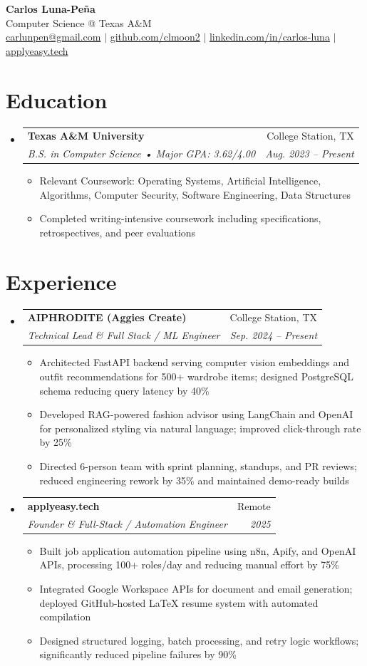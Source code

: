 \documentclass[letterpaper,11pt]{article}
\makeatletter
\newcommand{\resumeItem}[1]{
  \item\small{{#1 \vspace{-2pt}}}
}
\newcommand{\resumeSubheading}[4]{
  \vspace{-2pt}\item
    \begin{tabular*}{0.97\textwidth}[t]{l@{\extracolsep{\fill}}r}
      \textbf{#1} & #2 \\
      \textit{\small#3} & \textit{\small #4} \\
    \end{tabular*}\vspace{-7pt}
}
\newcommand{\resumeSubHeadingListStart}{\begin{itemize}[leftmargin=0.15in, label={}]}
\newcommand{\resumeSubHeadingListEnd}{\end{itemize}}
\newcommand{\resumeItemListStart}{\begin{itemize}}
\newcommand{\resumeItemListEnd}{\end{itemize}\vspace{-5pt}}
\makeatother
\begin{document}
\begin{center}
  \textbf{\Huge Carlos Luna-Pe\~na} \\
  \small Computer Science @ Texas A\&M \\
  \href{mailto:carlunpen@gmail.com}{carlunpen@gmail.com} $|$ \href{https://github.com/clmoon2}{github.com/clmoon2} $|$ \href{https://linkedin.com/in/carlos-luna}{linkedin.com/in/carlos-luna} $|$ \href{https://applyeasy.tech}{applyeasy.tech}
\end{center}

\section{Education}
\resumeSubHeadingListStart
\resumeSubheading
  {Texas A\&M University}{College Station, TX}
  {B.S. in Computer Science • Major GPA: 3.62/4.00}{Aug. 2023 -- Present}
  \resumeItemListStart
    \resumeItem{Relevant Coursework: Operating Systems, Artificial Intelligence, Algorithms, Computer Security, Software Engineering, Data Structures}
    \resumeItem{Completed writing-intensive coursework including specifications, retrospectives, and peer evaluations}
  \resumeItemListEnd
\resumeSubHeadingListEnd

\section{Experience}
\resumeSubHeadingListStart
\resumeSubheading
  {AIPHRODITE (Aggies Create)}{College Station, TX}
  {Technical Lead \& Full Stack / ML Engineer}{Sep. 2024 -- Present}
  \resumeItemListStart
    \resumeItem{Architected FastAPI backend serving computer vision embeddings and outfit recommendations for 500+ wardrobe items; designed PostgreSQL schema reducing query latency by 40\%}
    \resumeItem{Developed RAG-powered fashion advisor using LangChain and OpenAI for personalized styling via natural language; improved click-through rate by 25\%}
    \resumeItem{Directed 6-person team with sprint planning, standups, and PR reviews; reduced engineering rework by 35\% and maintained demo-ready builds}
  \resumeItemListEnd

\resumeSubheading
  {applyeasy.tech}{Remote}
  {Founder \& Full-Stack / Automation Engineer}{2025}
  \resumeItemListStart
    \resumeItem{Built job application automation pipeline using n8n, Apify, and OpenAI APIs, processing 100+ roles/day and reducing manual effort by 75\%}
    \resumeItem{Integrated Google Workspace APIs for document and email generation; deployed GitHub-hosted LaTeX resume system with automated compilation}
    \resumeItem{Designed structured logging, batch processing, and retry logic workflows; significantly reduced pipeline failures by 90\%}
  \resumeItemListEnd
\resumeSubHeadingListEnd
\end{document}
